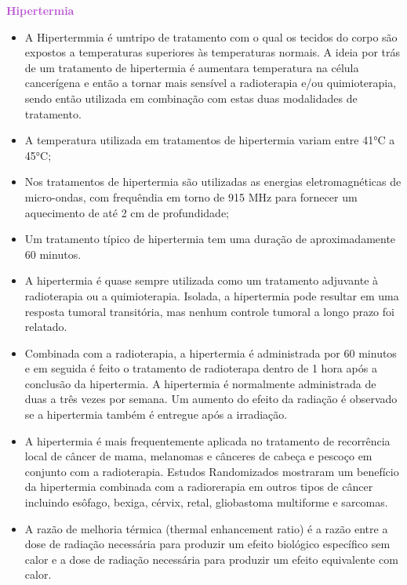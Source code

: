 \documentclass[11pt,a4paper]{article}
\newcounter{exemplo}
\begin{document}
\begin{exemplo}
    \textcolor{MediumOrchid}{\LobsterTwo\textbf{Hipertermia}}
    \begin{itemize}
        \item A Hipertermmia é umtripo de tratamento com o qual os tecidos do corpo são expostos a temperaturas superiores às temperaturas normais. A ideia por trás de um tratamento de hipertermia é aumentara temperatura na célula cancerígena e então a tornar mais sensível a radioterapia e/ou quimioterapia, sendo então utilizada em combinação com estas duas modalidades de tratamento.
        
        \item A temperatura utilizada em tratamentos de hipertermia variam entre \ang{41}C a \ang{45}C;
        
        \item Nos tratamentos de hipertermia são utilizadas as energias eletromagnéticas de micro-ondas, com frequêndia em torno de 915 MHz para fornecer um aquecimento de até 2 cm de profundidade;
        
        \item Um tratamento típico de hipertermia tem uma duração de aproximadamente 60 minutos.
        
        \item A hipertermia é quase sempre utilizada como um tratamento adjuvante à radioterapia ou a quimioterapia. Isolada, a hipertermia pode resultar em uma resposta tumoral transitória, mas nenhum controle tumoral a longo prazo foi relatado.
        
        \item Combinada com a radioterapia, a hipertermia é administrada por 60 minutos e em seguida é feito o tratamento de radioterapa dentro de 1 hora após a conclusão da hipertermia. A hipertermia é normalmente administrada de duas a três vezes por semana. Um aumento do efeito da radiação é observado se a hipertermia também é entregue após a irradiação.
        
        \item A hipertermia é mais frequentemente aplicada no tratamento de recorrência local de câncer de mama, melanomas e cânceres de cabeça e pescoço em conjunto com a radioterapia. Estudos Randomizados mostraram um benefício da hipertermia combinada com a radiorerapia em outros tipos de câncer incluindo esôfago, bexiga, cérvix, retal, gliobastoma multiforme e sarcomas.
        
        \item A razão de melhoria térmica (thermal enhancement ratio) é a razão entre a dose de radiação necessária para produzir um efeito biológico específico sem calor e a dose de radiação necessária para produzir um efeito equivalente com calor.
        

\end{itemize}
\end{exemplo}
\end{document}
